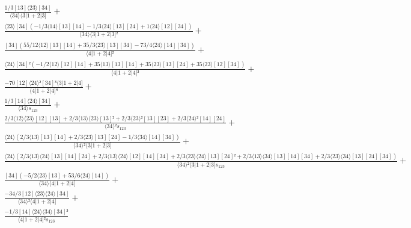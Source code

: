 \documentclass[varwidth, border=5pt]{standalone}
\begin{document}
\begin{my}
$\begin{gathered}
\scriptscriptstyle\frac{1/3[13]⟨23⟩[34]}{⟨34⟩⟨3|1+2|3]} +\\
\scriptscriptstyle\frac{⟨23⟩[34](-1/3⟨14⟩[13][14]-1/3⟨24⟩[13][24]+1⟨24⟩[12][34])}{⟨34⟩⟨3|1+2|3]²} +\\
\scriptscriptstyle\frac{[34](55/12⟨12⟩[13][14]+35/3⟨23⟩[13][34]-73/4⟨24⟩[14][34])}{⟨4|1+2|4]²} +\\
\scriptscriptstyle\frac{⟨24⟩[34]²(-1/2⟨12⟩[12][14]+35⟨13⟩[13][14]+35⟨23⟩[13][24]+35⟨23⟩[12][34])}{⟨4|1+2|4]³} +\\
\scriptscriptstyle\frac{-70[12]⟨24⟩²[34]³⟨3|1+2|4]}{⟨4|1+2|4]⁴} +\\
\scriptscriptstyle\frac{1/3[14]⟨24⟩[34]}{⟨34⟩s_{123}} +\\
\scriptscriptstyle\frac{2/3⟨12⟩⟨23⟩[12][13]+2/3⟨13⟩⟨23⟩[13]²+2/3⟨23⟩²[13][23]+2/3⟨24⟩²[14][24]}{⟨34⟩²s_{123}} +\\
\scriptscriptstyle\frac{⟨24⟩(2/3⟨13⟩[13][14]+2/3⟨23⟩[13][24]-1/3⟨34⟩[14][34])}{⟨34⟩²⟨3|1+2|3]} +\\
\scriptscriptstyle\frac{⟨24⟩(2/3⟨13⟩⟨24⟩[13][14][24]+2/3⟨13⟩⟨24⟩[12][14][34]+2/3⟨23⟩⟨24⟩[13][24]²+2/3⟨13⟩⟨34⟩[13][14][34]+2/3⟨23⟩⟨34⟩[13][24][34])}{⟨34⟩²⟨3|1+2|3]s_{123}} +\\
\scriptscriptstyle\frac{[34](-5/2⟨23⟩[13]+53/6⟨24⟩[14])}{⟨34⟩⟨4|1+2|4]} +\\
\scriptscriptstyle\frac{-34/3[12]⟨23⟩⟨24⟩[34]}{⟨34⟩²⟨4|1+2|4]} +\\
\scriptscriptstyle\frac{-1/3[14]⟨24⟩⟨34⟩[34]³}{⟨4|1+2|4]²s_{123}} \phantom{+}
\end{gathered}$
\end{my}
\end{document}

